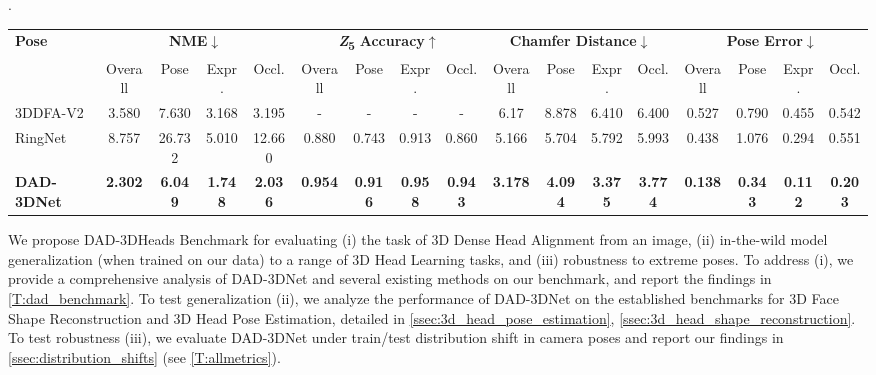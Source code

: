 \documentclass[10pt,twocolumn,letterpaper]{article}
\begin{document}
\begin{table*}[h!tb]
\footnotesize
\centering
\caption{\textbf{Comparison with state-of-the-art 3D Dense Head Alignment models on DAD-3DHeads Benchmark:} We compute the metrics on full test dataset as well as on challenging atypical poses (Pose), compound expressions (Expr.) and heavy occlusions (Occl.) subsets. DAD-3DNet shows superior performance on all subsets. Note: $Z_n$ is computed only for methods that use FLAME mesh topology.}.
\resizebox{\textwidth}{!} {
    \begin{tabular}{@{}l|cccc|cccc|cccc|cccc@{}}
    \toprule \multirow{2}{*}{\textbf{Pose}}& 
        \multicolumn{4}{c}{\textbf{NME}{$\downarrow$}} &
        \multicolumn{4}{c}{\textbf{\textit{Z}\textsubscript{5}} \textbf{Accuracy}{$\uparrow$}} &
        \multicolumn{4}{c}{\textbf{Chamfer Distance}{$\downarrow$}} & 
        \multicolumn{4}{c}{\textbf{Pose Error}{$\downarrow$}} \\
                 & {Overall}  &  {Pose}  &  {Expr.}  &  {Occl.}    
                 & {Overall}  &  {Pose}  &  {Expr.}  &  {Occl.}  
                 & {Overall}  &  {Pose}  &  {Expr.}  &  {Occl.}  
                 & {Overall}  &  {Pose}  &  {Expr.}  &  {Occl.} \\\toprule 3DDFA-V2 \cite{3ddfa_cleardusk, guo2020towards}  & 3.580  &  7.630  &  3.168  &  3.195  &  
                   -  &  -  &  -  &  -  &  
                   6.17  &  8.878  &  6.410  &  6.400  & 
                   0.527  &  0.790  &  0.455  &  0.542   \\
        RingNet \cite{RingNet}  & 8.757  &  26.732  &  5.010  &  12.660  &  
                   0.880  &  0.743  &  0.913  &  0.860  &  
                   5.166  &  5.704  &  5.792  &  5.993  & 
                   0.438  &  1.076  &  	0.294  &  0.551   \\
        \textbf{DAD-3DNet}
                 & \textbf{2.302}  &  \textbf{6.049}  &  \textbf{1.748}  &  \textbf{2.036}  &  
                   \textbf{0.954}  &  \textbf{0.916}  &  \textbf{0.958}  &  \textbf{0.943}  &  
                   \textbf{3.178}  &  \textbf{4.094}  &  \textbf{3.375}  &  \textbf{3.774}  & 
                   \textbf{0.138}  &  \textbf{0.343}  &  \textbf{0.112}  &  \textbf{0.203}   \\\bottomrule
    \end{tabular}}
\label{T:dad_benchmark}
\end{table*}
 
We propose DAD-3DHeads Benchmark for evaluating (i) the task of 3D Dense Head Alignment from an image, (ii) in-the-wild model generalization (when trained on our data) to a range of 3D Head Learning tasks, and (iii) robustness to extreme poses. 
To address (i), we provide a comprehensive analysis of DAD-3DNet and several existing methods on our benchmark, and report the findings in \cref{T:dad_benchmark}. To test generalization (ii), we analyze the performance of DAD-3DNet on the established benchmarks for 3D Face Shape Reconstruction and 3D Head Pose Estimation, detailed in \cref{ssec:3d_head_pose_estimation}, \cref{ssec:3d_head_shape_reconstruction}.
To test robustness (iii), we evaluate DAD-3DNet under train/test distribution shift in camera poses and report our findings in \cref{ssec:distribution_shifts} (see \cref{T:allmetrics}).
\end{document}

